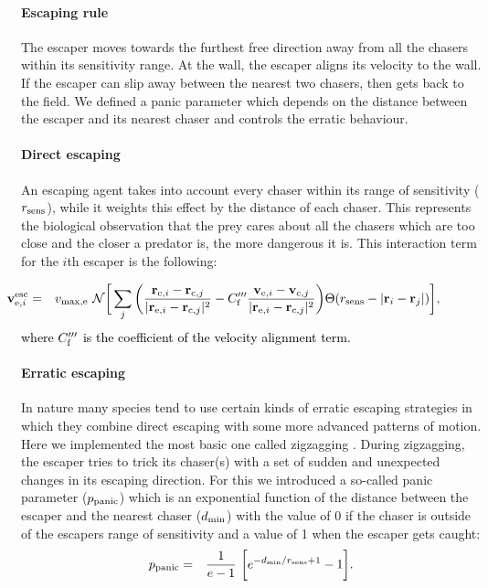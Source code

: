 \documentclass[12pt,a4paper,final]{iopart}
\newcommand{\revision}{\textcolor{black}}
\newcommand{\revisiontwo}{\textcolor{black}}
\begin{document}
\paragraph{Escaping rule} The escaper moves towards the furthest free direction away from all the chasers within its sensitivity range. 
At the wall, the escaper aligns its velocity to the wall. If the escaper can slip away between the nearest two chasers, then gets back to the field. We defined a panic parameter which depends on the distance between the escaper and its nearest chaser and controls the erratic behaviour. 

\paragraph{Direct escaping} An escaping agent takes into account every chaser within its range of sensitivity ($r_{\rm sens}$), while it weights this effect by the distance of each chaser. This represents the biological observation that the prey cares about all the chasers which are too close and the closer a predator is, the more dangerous it is. This interaction term for the $i$th escaper is the following:

\begin{eqnarray}
\hspace{-1.5cm} {\bf v}_{{\rm e}, i}^{\rm esc} &=& v_{\rm max, e} \  \mathcal{N} \bigg[ \sum_j \bigg( \frac{{\bf r}_{{\rm e},i} - {\bf r}_{{\rm c},j}}{|{\bf r}_{{\rm e},i} - {\bf r}_{{\rm c},j}|^2} - C'''_{\rm f} \frac{{\bf v}_{{\rm e},i} - {\bf v}_{{\rm c},j}}{|{\bf r}_{{\rm e},i} - {\bf r}_{{\rm c},j}|^2}\bigg) \Theta(r_{\rm sens} - |{\bf r}_i - {\bf r}_j|) \bigg],
\end{eqnarray}
\revision{where $C'''_{\revisiontwo{\rm f}}$ is the coefficient of the velocity alignment term.}


\paragraph{Erratic escaping} 
In nature many species tend to use certain kinds of erratic escaping strategies in which they combine direct escaping with some more advanced patterns of motion. Here we implemented the most basic one called zigzagging \cite{edut2004protean, humphries1970protean}. During zigzagging, the escaper tries to trick its chaser(s) with a set of sudden and unexpected changes in its escaping direction. For this we introduced a so-called panic parameter ($p_{\rm panic}$) which is an exponential function of the distance between the escaper and the nearest chaser ($d_{\rm min}$) with the value of 0 if the chaser is outside of the escapers range of sensitivity and a value of 1 when the escaper gets caught:
\begin{eqnarray}
p_{\rm panic} &=& \frac{1}{e - 1} \  \bigg[ e^{-d_{\rm min}/r_{\rm sens} +1} - 1 \bigg]. \label{eq:panic}
\end{eqnarray}
\end{document}
